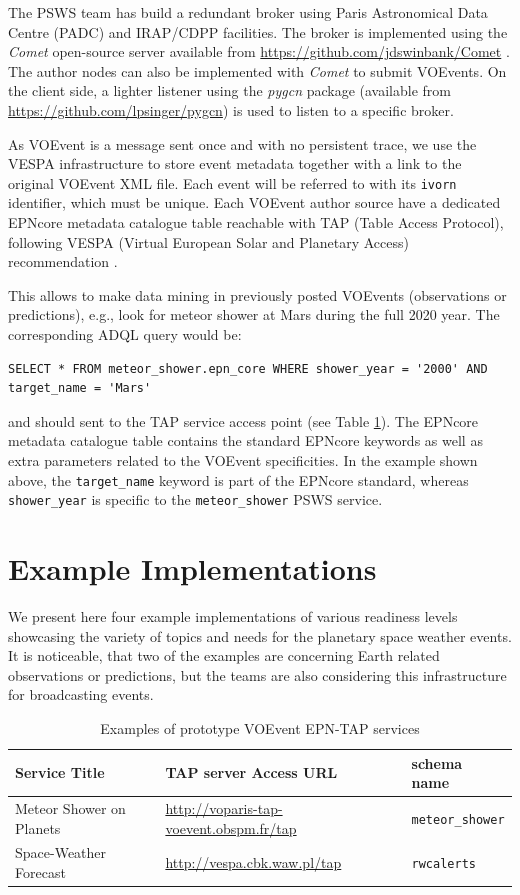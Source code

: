 \documentclass[referee,a4paper,12pt,traditabstract]{swsc}
\begin{document}
\begin{linenumbers}
The PSWS team has build a redundant broker using Paris Astronomical Data Centre (PADC) and IRAP/CDPP facilities.  The broker is implemented using the \emph{Comet} open-source server available from \url{https://github.com/jdswinbank/Comet} \cite{Swinbank:2014ft}. The author nodes can also be implemented with \emph{Comet} to submit VOEvents. On the client side, a lighter listener using the \emph{pygcn} package (available from \url{https://github.com/lpsinger/pygcn}) is used to listen to a specific broker. 

As VOEvent is a message sent once and with no persistent trace, we use the VESPA infrastructure to store event metadata together with a link to the original VOEvent XML file. Each event will be referred to with its {\tt ivorn} identifier, which must be unique. Each VOEvent author source have a dedicated EPNcore metadata catalogue table reachable with TAP (Table Access Protocol), following VESPA (Virtual European Solar and Planetary Access) recommendation \cite{vespa}.

This allows to make data mining in previously posted VOEvents (observations or predictions), e.g., look for meteor shower at Mars during the full 2020 year. The corresponding ADQL \cite{adql} query would be:
\begin{verbatim}
SELECT * FROM meteor_shower.epn_core WHERE shower_year = '2000' AND 
target_name = 'Mars' 
\end{verbatim}
and should sent to the TAP service access point (see Table \ref{tab-services}). The EPNcore metadata catalogue table contains the standard EPNcore keywords as well as extra parameters related to the VOEvent specificities. In the example shown above, the {\tt target\_name} keyword is part of the EPNcore standard, whereas {\tt shower\_year} is specific to the {\tt meteor\_shower} PSWS service.

\section{Example Implementations}

We present here four example implementations of various readiness levels showcasing the variety of topics and needs for the planetary space weather events. It is noticeable, that two of the examples are concerning Earth related observations or predictions, but the teams are also considering this infrastructure for broadcasting events.

\begin{table}
\begin{tabular}{lll}
Service Title&TAP server Access URL&schema name\\
\hline
Meteor Shower on Planets & \url{http://voparis-tap-voevent.obspm.fr/tap} & {\tt meteor\_shower}\\
Space-Weather Forecast & \url{http://vespa.cbk.waw.pl/tap} & {\tt rwcalerts}\\
\end{tabular}
\caption{Examples of prototype VOEvent EPN-TAP services}
\label{tab-services}
\end{table}


\end{linenumbers}
\end{document}

